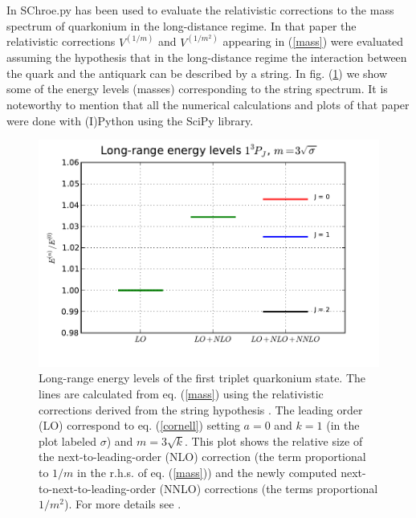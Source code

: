 \documentclass[10pt, a4paper, twocolumn]{article}
\begin{document}
{In \cite{Brambilla:2014eaa} SChroe.py has been used to evaluate the relativistic corrections to the mass spectrum of quarkonium in the long-distance regime. In that paper the relativistic corrections $V^{(1/m)}$ and $V^{(1/m^2)}$ appearing in (\ref{mass}) were evaluated assuming the hypothesis that in the long-distance regime the interaction between the quark and the antiquark can be described by a string. In fig. (\ref{string-levels}) we show some of the energy levels (masses) corresponding to the string spectrum. It is noteworthy to mention that all the numerical calculations and plots of that paper were done with (I)Python using the SciPy library.
\begin{figure}[htb]
\begin{centering}
    \includegraphics[width=1.0\linewidth]{string-levels.pdf}
    \caption{Long-range energy levels of the first triplet quarkonium state. The lines are calculated from eq. (\ref{mass}) using the relativistic corrections derived from the string hypothesis \cite{Brambilla:2014eaa}. The leading order (LO) correspond to eq. (\ref{cornell}) setting $a=0$ and $k=1$ (in the plot labeled $\sigma$) and $m=3\sqrt{k}$. This plot shows the relative size of the next-to-leading-order (NLO) correction (the term proportional to $1/m$ in the r.h.s. of eq. (\ref{mass})) and the newly computed next-to-next-to-leading-order (NNLO) corrections (the terms proportional $1/m^2$). For more details see \cite{Brambilla:2014eaa}.}
\label{string-levels}
\end{centering}
\end{figure}
\\
}
\end{document}
